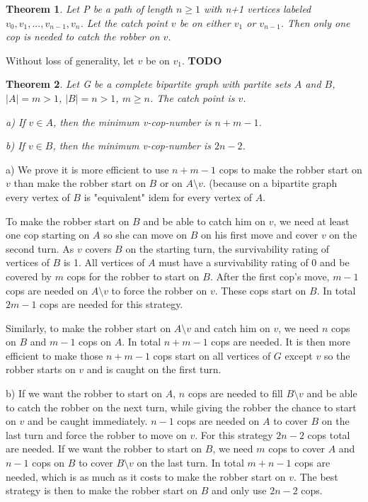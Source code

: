 \documentclass{article}
\newtheorem{theorem}{Theorem}[section]
\newenvironment{proof}[1][Proof]{\begin{trivlist}
\item[\hskip \labelsep {\bfseries #1}]}{\end{trivlist}}
\begin{document}
\begin{theorem}
\label{path-distance-1}
Let P be a path of length $n \ge 1$ with n+1 vertices labeled $v_0, v_1, ... , v_{n-1}, v_n $. Let the catch point $v$ be on either $v_1$ or $v_{n-1}$. Then only one cop is needed to catch the robber on $v$.
\end{theorem}
\begin{proof}
Without loss of generality, let $v$ be on $v_1$. \textbf{TODO}
\end{proof}
\begin{theorem}
\label{complete_bipartite}
Let G be a complete bipartite graph with partite sets $A$ and $B$, $|A| = m >1 $,  $|B| = n > 1$, $m \ge n$. The catch point is $v$.

a) If $v \in A$, then the minimum v-cop-number is $n+m-1$. 

b) If $v \in B$, then the minimum v-cop-number is $2n-2$.

\end{theorem}
\begin{proof}
a) We prove it is more efficient to use $n+m-1$ cops to make the robber start on $v$ than make the robber start on $B$ or on $A\setminus v$. (because on a bipartite graph every vertex of $B$ is "equivalent" idem for every vertex of $A$. 

To make the robber start on $B$ and be able to catch him on $v$, we need at least one cop starting on $A$ so she can move on $B$ on his first move and cover $v$ on the second turn. As $v$ covers $B$ on the starting turn, the survivability rating of vertices of $B$ is 1. All vertices of $A$ must have a survivability rating of 0 and be covered by $m$ cops for the robber to start on $B$. After the first cop's move, $m-1$ cops are needed on $A \setminus v$ to force the robber on $v$. These cops start on $B$. In total $2m-1$ cops are needed for this strategy. 

Similarly, to make the robber start on $A \setminus v$ and catch him on $v$, we need $n$ cops on $B$ and  $m-1$ cops on $A$. In total $n+m-1$ cops are needed. It is then more efficient to make those $n+m-1$ cops start on all vertices of $G$ except $v$ so the robber starts on $v$ and is caught on the first turn.

b) If we want the robber to start on $A$, $n$ cops are needed to fill $B \setminus v$  and be able to catch the robber on the next turn, while giving the robber the chance to start on $v$ and be caught immediately. $n-1$ cops are needed on $A$ to cover $B$ on the last turn and force the robber to move on $v$. For this strategy $2n-2$ cops total are needed. If we want the robber to start on $B$, we need $m$ cops to cover $A$ and $n-1$ cops on $B$ to cover $B\setminus v$ on the last turn. In total $m+n-1$ cops are needed, which is as much as it costs to make the robber start on $v$. The best strategy is then to make the robber start on $B$ and only use $2n-2$ cops. 

\end{proof}
\end{document}
